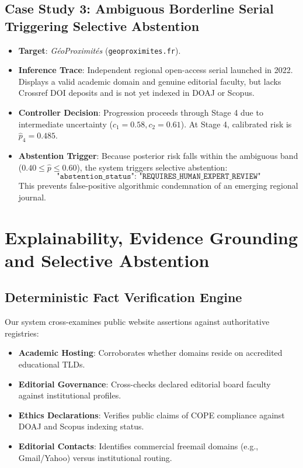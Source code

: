 \documentclass[journal]{IEEEtran}
\begin{document}
\subsection{Case Study 3: Ambiguous Borderline Serial Triggering Selective Abstention}
\begin{itemize}
    \item \textbf{Target}: \textit{GéoProximités} (\texttt{geoproximites.fr}).
    \item \textbf{Inference Trace}: Independent regional open-access serial launched in 2022. Displays a valid academic domain and genuine editorial faculty, but lacks Crossref DOI deposits and is not yet indexed in DOAJ or Scopus.
    \item \textbf{Controller Decision}: Progression proceeds through Stage 4 due to intermediate uncertainty ($c_1 = 0.58, c_2 = 0.61$). At Stage 4, calibrated risk is $\hat{p}_4 = 0.485$.
    \item \textbf{Abstention Trigger}: Because posterior risk falls within the ambiguous band ($0.40 \le \hat{p} \le 0.60$), the system triggers selective abstention:
    \begin{equation*}
    \texttt{"abstention\_status": "REQUIRES\_HUMAN\_EXPERT\_REVIEW"}
    \end{equation*}
    This prevents false-positive algorithmic condemnation of an emerging regional journal.
\end{itemize}

\section{Explainability, Evidence Grounding and Selective Abstention}

\subsection{Deterministic Fact Verification Engine}
Our system cross-examines public website assertions against authoritative registries:
\begin{itemize}
    \item \textbf{Academic Hosting}: Corroborates whether domains reside on accredited educational TLDs.
    \item \textbf{Editorial Governance}: Cross-checks declared editorial board faculty against institutional profiles.
    \item \textbf{Ethics Declarations}: Verifies public claims of COPE compliance against DOAJ and Scopus indexing status.
    \item \textbf{Editorial Contacts}: Identifies commercial freemail domains (e.g., Gmail/Yahoo) versus institutional routing.
\end{itemize}
\end{document}
